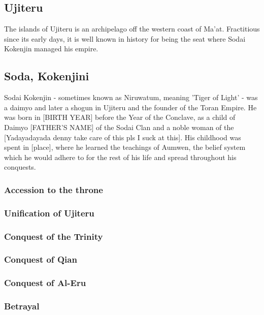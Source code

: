 \begin{multicols}{2}
	\section{Ujiteru}
		The islands of Ujiteru is an archipelago off the western coast of Ma'at. Fractitious since its early days, it is well known in history for being the seat where Sodai Kokenjin managed his empire.
		\subsection{Soda, Kokenjini}
					 
			Sodai Kokenjin - sometimes known as Niruwatum, meaning 'Tiger of Light' - was a daimyo and later a shogun in Ujiteru and the founder of the Toran Empire. He was born in [BIRTH YEAR] before the Year of the Conclave, as a child of Daimyo [FATHER'S NAME] of the Sodai Clan and a noble woman of the [Yadayadayada denny take care of this pls I suck at this]. His childhood was spent in [place], where he learned the teachings of Aumwen, the belief system which he would adhere to for the rest of his life and spread throughout his conquests.\par
			\subsubsection{Accession to the throne}
			\subsubsection{Unification of Ujiteru}
			\subsubsection{Conquest of the Trinity}
			\subsubsection{Conquest of Qian}
			\subsubsection{Conquest of Al-Eru}
			\subsubsection{Betrayal}
\end{multicols}